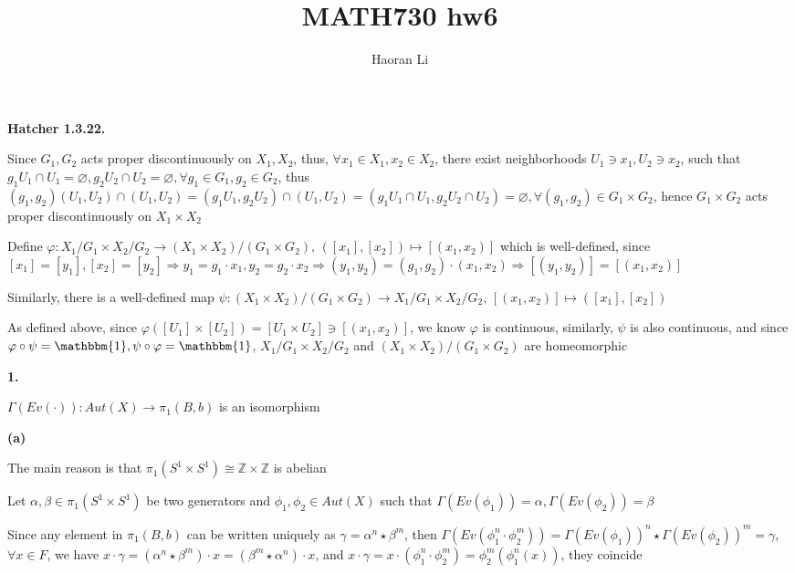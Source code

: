 \documentclass[12pt]{article}
\title{MATH730 hw6}
\author{Haoran Li}
\date{}
\begin{document}
\maketitle
\textbf{Hatcher 1.3.22.} \par
Since $G_1,G_2$ acts proper discontinuously on $X_1, X_2$, thus, $\forall x_1\in X_1,x_2\in X_2$, there exist neighborhoods $U_1\ni x_1,U_2\ni x_2$, such that $g_1U_1\cap U_1=\varnothing,g_2U_2\cap U_2=\varnothing, \forall g_1\in G_1, g_2\in G_2$, thus $(g_1,g_2)(U_1,U_2)\cap(U_1,U_2)=(g_1U_1,g_2U_2)\cap(U_1,U_2)=(g_1U_1\cap U_1,g_2U_2\cap U_2)=\varnothing, \forall (g_1,g_2)\in G_1\times G_2$, hence $G_1\times G_2$ acts proper discontinuously on $X_1\times X_2$ \par
Define $\varphi: X_1/G_1\times X_2/G_2\rightarrow (X_1\times X_2)/(G_1\times G_2), \, ([x_1],[x_2])\mapsto [(x_1,x_2)]$ which is well-defined, since $[x_1]=[y_1],[x_2]=[y_2]\Rightarrow y_1=g_1\cdot x_1,y_2=g_2\cdot x_2\Rightarrow (y_1,y_2)=(g_1,g_2)\cdot (x_1,x_2)\Rightarrow [(y_1,y_2)]=[(x_1,x_2)]$ \par
Similarly, there is a well-defined map $\psi:  (X_1\times X_2)/(G_1\times G_2)\rightarrow X_1/G_1\times X_2/G_2,\, [(x_1,x_2)]\mapsto ([x_1],[x_2])$ \par
As defined above, since $\varphi([U_1]\times[U_2])=[U_1\times U_2]\ni [(x_1,x_2)]$, we know $\varphi$ is continuous, similarly, $\psi$ is also continuous, and since $\varphi\circ\psi=\mathbbm{1},\psi\circ\varphi=\mathbbm{1}$, $X_1/G_1\times X_2/G_2$ and $(X_1\times X_2)/(G_1\times G_2)$ are homeomorphic \par
\textbf{1.} \par
$\Gamma(Ev(\cdot)): Aut(X)\rightarrow \pi_1(B,b)$ is an isomorphism \par
\textbf{(a)} \par
The main reason is that $\pi_1(S^1\times S^1)\cong \mathbb{Z}\times\mathbb{Z}$ is abelian \par
Let $\alpha,\beta\in\pi_1(S^1\times S^1)$ be two generators and $\phi_1,\phi_2\in Aut(X)$ such that $\Gamma(Ev(\phi_1))=\alpha, \Gamma(Ev(\phi_2))=\beta$ \par
Since any element in $\pi_1(B,b)$ can be written uniquely as $\gamma=\alpha^n\star\beta^m$, then $\Gamma(Ev(\phi_1^n\cdot\phi_2^m))=\Gamma(Ev(\phi_1))^n\star\Gamma(Ev(\phi_2))^m=\gamma$, $\forall x\in F$, we have $x\cdot\gamma=(\alpha^n\star\beta^m)\cdot x=(\beta^m\star\alpha^n)\cdot x$, and $x\cdot\gamma=x\cdot(\phi_1^n\cdot\phi_2^m)=\phi_2^m(\phi_1^n(x))$, they coincide \par
\end{document}
